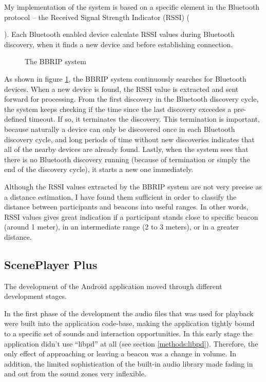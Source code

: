 \documentclass[a4paper,11pt]{article}
\begin{document}
My implementation of the system is based on a specific element in the Bluetooth protocol -- the Received Signal Strength Indicator (RSSI) ({\cite{bray12}).
Each Bluetooth enabled device calculate RSSI values during Bluetooth discovery, when it finds a new device and before establishing connection.

\begin{figure}[!htb]
	\centering
	\def\svgwidth{\columnwidth}
  	
	\caption{The BBRIP system}\label{fig:bbrip}
\end{figure}

As shown in figure \ref{fig:bbrip}, the BBRIP system continuously searches for Bluetooth devices.
When a new device is found, the RSSI value is extracted and sent forward for processing.
From the first discovery in the Bluetooth discovery cycle, the system keeps checking if the time since the last discovery exceedes a pre-defined timeout.
If so, it terminates the discovery.
This termination is important, because naturally a device can only be discovered once in each Bluetooth discovery cycle, and long periods of time without new discoveries indicates that all of the nearby devices are already found.
Lastly, when the system sees that there is no Bluetooth discovery running (because of termination or simply the end of the discovery cycle), it starts a new one immediately.

Although the RSSI values extracted by the BBRIP system are not very precise as a distance estimation, I have found them sufficient in order to classify the distance between participants and beacons into useful ranges.
In other words, RSSI values gives great indication if a participant stands close to specific beacon (around 1 meter), in an intermediate range (2 to 3 meters), or in a greater distance.

\subsection{ScenePlayer Plus}\label{sceneplayer_plus}

The development of the Android application moved through different development stages.

In the first phase of the development the audio files that was used for playback were built into the application code-base, making the application tightly bound to a specific set of sounds and interaction opportunities.
In this early stage the application didn't use ``libpd'' at all (see section \ref{methods:libpd}).
Therefore, the only effect of approaching or leaving a beacon was a change in volume.
In addition, the limited sophistication of the built-in audio library made fading in and out from the sound zones very inflexible.

}
\end{document}
